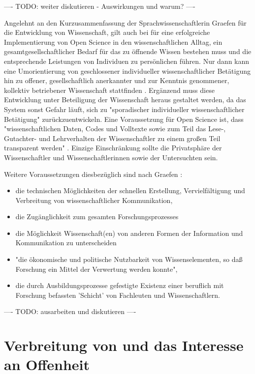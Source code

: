 ---- TODO: weiter diskutieren - Auswirkungen und warum? ----

Angelehnt an den Kurzusammenfassung der Sprachwissenschaftlerin Graefen für die Entwicklung von Wissenschaft, gilt auch bei für eine erfolgreiche Implementierung von Open Science in den wissenschaftlichen Alltag, ein gesamtgesellschaftlicher Bedarf für das zu öffnende Wissen bestehen muss und die entsprechende Leistungen von Individuen zu persönlichen führen. Nur dann kann eine Umorientierung von geschlossener individueller wissenschaftlicher Betätigung hin zu offener, gesellschaftlich anerkannter und zur Kenntnis genommener, kollektiv betriebener Wissenschaft stattfinden \cite{graefen2007_wissenschaftliche_artikel}. Ergänzend muss diese Entwicklung unter Beteiligung der Wissenschaft heraus gestaltet werden, da das System sonst Gefahr läuft, sich zu "sporadischer individueller wissenschaftlicher Betätigung" \cite{graefen2007_wissenschaftliche_artikel} zurückzuentwickeln. Eine Voraussetzung für Open Science ist, dass "wissenschaftlichen Daten, Codes und Volltexte sowie zum Teil das Lese-, Gutachter- und Lehrverhalten der Wissenschaftler zu einem großen Teil transparent werden" \cite{brembs2015open}. Einzige Einschränkung sollte die Privatsphäre der Wissenschaftler und Wissenschaftlerinnen sowie der Untersuchten sein.

Weitere Voraussetzungen diesbezüglich sind nach Graefen \cite{graefen2007_wissenschaftliche_artikel}:
\begin{itemize}
\item die technischen Möglichkeiten der schnellen Erstellung, Vervielfältigung und Verbreitung von wissenschaftlicher Kommunikation,
\item die Zugänglichkeit zum gesamten Forschungsprozesses
\item die Möglichkeit Wissenschaft(en) von anderen Formen der Information und Kommunikation zu unterscheiden
\item "die ökonomische und politische Nutzbarkeit von Wissenselementen, so daß
Forschung ein Mittel der Verwertung werden konnte",
\item die durch Ausbildungsprozesse gefestigte Existenz einer beruflich mit Forschung befassten 'Schicht' von Fachleuten und Wissenschaftlern.
\end{itemize}

---- TODO: ausarbeiten und diskutieren ----

\section{Verbreitung von und das Interesse an Offenheit}

